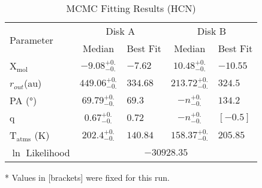 \begin{table}[h!]
  \centering
  \begin{threeparttable}
    \caption{MCMC Fitting Results (HCN)}
    \label{table:fit_hcn}
    \renewcommand{\arraystretch}{1.2}
    \begin{tabular}{l c l c l }
      \toprule \toprule
      \multirow{2}{*}{Parameter} & \multicolumn{2}{c}{Disk A} & \multicolumn{2}{c}{Disk B} \\
                                 & Median & Best Fit          & Median & Best Fit \\
      \midrule %
      X$_\text{mol}$             & $ -9.08_{-0.} ^{+0.}$ & $-7.62$    & $ 10.48_{-0.} ^{+0.}$ & $-10.55$ \\
      $r_{out}$(\si{au})        & $ 449.06_{-0.} ^{+0.}$ & $334.68$    & $ 213.72_{-0.}^{+0.}$  & $324.5$    \\
      PA  (\si{\degree})        & $ 69.79_{-0.} ^{+0.}$  & $69.3$   & $ -n _{-0.} ^{+0.}$  & $134.2$  \\
      q                         & $ 0.67_{-0.} ^{+0.}$   & $0.72$   & $ -n _{-0.} ^{+0.}$  & $[-0.5]$  \\
      T$_\text{atms}$ (\si{\K}) & $ 202.4_{-0.} ^{+0.}$  & $140.84$  & $ 158.37_{-0.} ^{+0.}$  & $205.85$  \\
      $\ln$ Likelihood          & \multicolumn{4}{c}{$-30928.35$} \\
      \bottomrule
    \end{tabular}
    \begin{tablenotes}\footnotesize
      \item[*] Values in [brackets] were fixed for this run.
    \end{tablenotes}
  \end{threeparttable}
\end{table}






